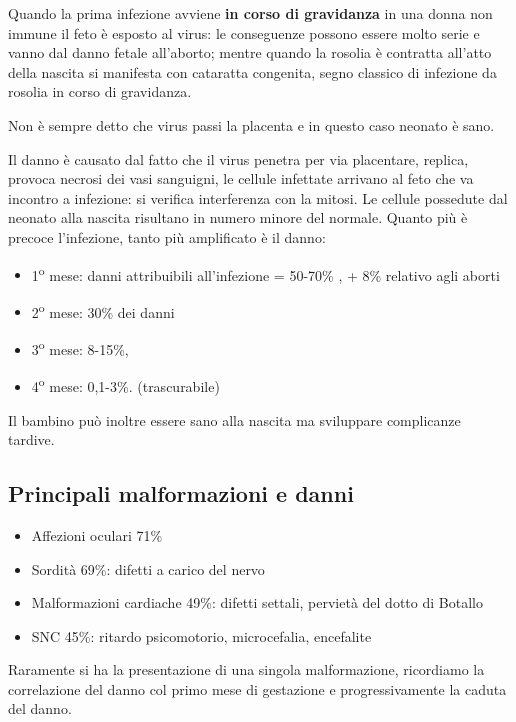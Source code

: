 Quando la prima infezione avviene \textbf{in corso di gravidanza} in una
donna non immune il feto è esposto al virus: le conseguenze possono
essere molto serie e vanno dal danno fetale all'aborto; mentre quando la
rosolia è contratta all'atto della nascita si manifesta con cataratta
congenita, segno classico di infezione da rosolia in corso di
gravidanza.

Non è sempre detto che virus passi la placenta e in questo caso neonato
è sano.

Il danno è causato dal fatto che il virus penetra per via placentare,
replica, provoca necrosi dei vasi sanguigni, le cellule infettate
arrivano al feto che va incontro a infezione: si verifica interferenza
con la mitosi. Le cellule possedute dal neonato alla nascita risultano
in numero minore del normale. Quanto più è precoce l'infezione, tanto
più amplificato è il danno:

\begin{itemize}
\item
  1\textsuperscript{o} mese: danni attribuibili all'infezione = 50-70\% , + 8\% relativo
  agli aborti
\item
  2\textsuperscript{o} mese: 30\% dei danni
\item
  3\textsuperscript{o} mese: 8-15\%,
\item
  4\textsuperscript{o} mese: 0,1-3\%. (trascurabile)
\end{itemize}

Il bambino può inoltre essere sano alla nascita ma sviluppare
complicanze tardive.

\subsection{Principali malformazioni e danni} 

\begin{itemize}
\item
  Affezioni oculari 71\%
\item
  Sordità 69\%: difetti a carico del nervo
\item
  Malformazioni cardiache 49\%: difetti settali, pervietà del dotto di
  Botallo
\item
  SNC 45\%: ritardo psicomotorio, microcefalia, encefalite
\end{itemize}

Raramente si ha la presentazione di una singola malformazione,
ricordiamo la correlazione del danno col primo mese di gestazione e
progressivamente la caduta del danno.

